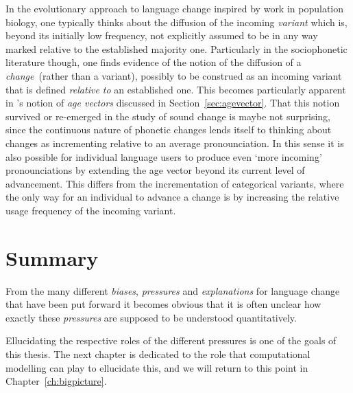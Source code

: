 In the evolutionary approach to language change inspired by work in population biology, one typically thinks about the diffusion of the incoming \emph{variant} which is, beyond its initially low frequency, not explicitly assumed to be in any way marked relative to the established majority one.
Particularly in the sociophonetic literature though, one finds evidence of the notion of the diffusion of a \emph{change}~(rather than a variant), possibly to be construed as an incoming variant that is defined \emph{relative to} an established one. This becomes particularly apparent in \citet{Labov2001}'s notion of \emph{age vectors} discussed in Section~\ref{sec:agevector}. 
That this notion survived or re-emerged in the study of sound change is maybe not surprising, since the continuous nature of phonetic changes lends itself to thinking about changes as incrementing relative to an average pronounciation. In this sense it is also possible for individual language users to produce even `more incoming' pronounciations by extending the age vector beyond its current level of advancement. This differs from the incrementation of categorical variants, where the only way for an individual to advance a change is by increasing the relative usage frequency of the incoming variant.

\section{Summary}

From the many different \emph{biases}, \emph{pressures} and \emph{explanations} for language change that have been put forward it becomes obvious that it is often unclear how exactly these \emph{pressures} are supposed to be understood quantitatively.

Ellucidating the respective roles of the different pressures is one of the goals of this thesis. The next chapter is dedicated to the role that computational modelling can play to ellucidate this, and we will return to this point in Chapter~\ref{ch:bigpicture}.
